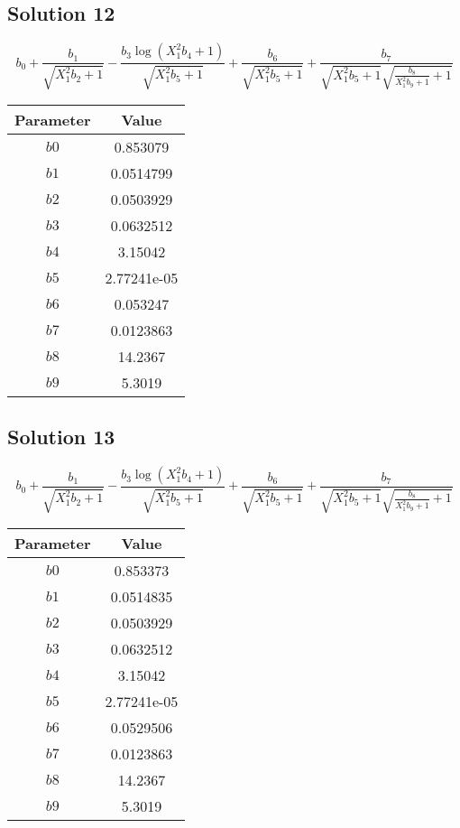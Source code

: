 \documentclass{article}
\begin{document}
\vspace{1em}
\subsection*{Solution 12}
\[
b_{0} + \frac{b_{1}}{\sqrt{X_{1}^{2} b_{2} + 1}} - \frac{b_{3} \log{\left(X_{1}^{2} b_{4} + 1 \right)}}{\sqrt{X_{1}^{2} b_{5} + 1}} + \frac{b_{6}}{\sqrt{X_{1}^{2} b_{5} + 1}} + \frac{b_{7}}{\sqrt{X_{1}^{2} b_{5} + 1} \sqrt{\frac{b_{8}}{X_{1}^{2} b_{9} + 1} + 1}}
\]
\begin{center}
\begin{tabular}{cc}
\toprule
Parameter & Value \\
\midrule
$b0$ & 0.853079 \\
$b1$ & 0.0514799 \\
$b2$ & 0.0503929 \\
$b3$ & 0.0632512 \\
$b4$ & 3.15042 \\
$b5$ & 2.77241e-05 \\
$b6$ & 0.053247 \\
$b7$ & 0.0123863 \\
$b8$ & 14.2367 \\
$b9$ & 5.3019 \\
\bottomrule
\end{tabular}
\end{center}

\vspace{1em}
\subsection*{Solution 13}
\[
b_{0} + \frac{b_{1}}{\sqrt{X_{1}^{2} b_{2} + 1}} - \frac{b_{3} \log{\left(X_{1}^{2} b_{4} + 1 \right)}}{\sqrt{X_{1}^{2} b_{5} + 1}} + \frac{b_{6}}{\sqrt{X_{1}^{2} b_{5} + 1}} + \frac{b_{7}}{\sqrt{X_{1}^{2} b_{5} + 1} \sqrt{\frac{b_{8}}{X_{1}^{2} b_{9} + 1} + 1}}
\]
\begin{center}
\begin{tabular}{cc}
\toprule
Parameter & Value \\
\midrule
$b0$ & 0.853373 \\
$b1$ & 0.0514835 \\
$b2$ & 0.0503929 \\
$b3$ & 0.0632512 \\
$b4$ & 3.15042 \\
$b5$ & 2.77241e-05 \\
$b6$ & 0.0529506 \\
$b7$ & 0.0123863 \\
$b8$ & 14.2367 \\
$b9$ & 5.3019 \\
\bottomrule
\end{tabular}
\end{center}
\end{document}
